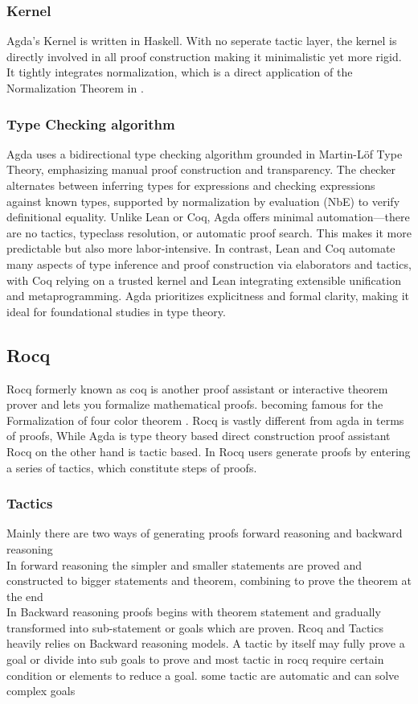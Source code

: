 \documentclass[12pt]{article}
\begin{document}
\subsubsection {Kernel}
Agda's Kernel is written in Haskell. With no seperate tactic layer, the kernel is directly involved in all proof construction making it minimalistic yet more rigid. It tightly integrates normalization, which is a direct application of the Normalization Theorem in \cite{martinlof1972intuitionistic_theory}.

\subsubsection{ Type Checking algorithm}
Agda uses a bidirectional type checking algorithm grounded in Martin-Löf Type Theory, emphasizing manual proof construction and transparency. The checker alternates between inferring types for expressions and checking expressions against known types, supported by normalization by evaluation (NbE) to verify definitional equality. Unlike Lean or Coq, Agda offers minimal automation—there are no tactics, typeclass resolution, or automatic proof search. This makes it more predictable but also more labor-intensive. In contrast, Lean and Coq automate many aspects of type inference and proof construction via elaborators and tactics, with Coq relying on a trusted kernel and Lean integrating extensible unification and metaprogramming. Agda prioritizes explicitness and formal clarity, making it ideal for foundational studies in type theory.
\cite{depPUlf}
\subsection{Rocq}
Rocq formerly known as coq is another proof assistant or interactive theorem prover and lets you formalize mathematical proofs. becoming famous for the Formalization of four color theorem  .
Rocq is vastly different from agda in terms of proofs, While Agda is type theory based direct construction proof assistant Rocq on the other hand is tactic based. 
In Rocq users generate proofs by entering a series of tactics, which constitute steps of proofs. \cite{rocq_manual}
\subsubsection{Tactics}
    Mainly there are two ways of generating proofs forward reasoning and backward reasoning  \\ 
    In forward reasoning the simpler and smaller statements are proved and constructed to bigger statements and theorem, combining to prove the theorem at the end \\
    In Backward reasoning proofs begins with theorem statement and gradually transformed into sub-statement or goals which are proven. 
    Rcoq and Tactics heavily relies on Backward reasoning models.
    A tactic by itself may fully prove a goal or divide into sub goals to prove and most tactic in rocq require certain condition or elements to reduce a goal.
    some tactic are automatic and can solve complex goals\\ \cite{rocq_tactics}
\end{document}
